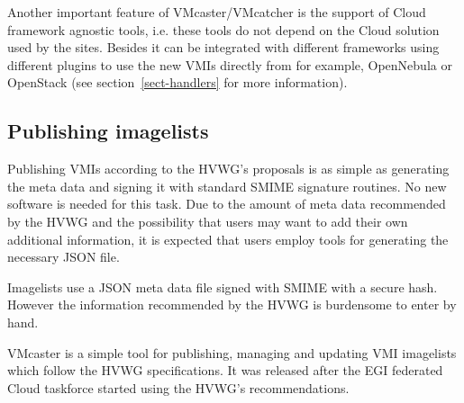 \documentclass{cai}
\begin{document}
Another important feature of VMcaster/VMcatcher is the support of Cloud framework agnostic tools, i.e. these tools do not depend on the Cloud solution used by the sites. Besides it can be integrated with different frameworks using different plugins to use the new VMIs directly from for example, OpenNebula or OpenStack (see section~\ref{sect-handlers} for more information).



\subsection{Publishing imagelists}
Publishing VMIs according to the HVWG's proposals is as simple as generating the meta data and signing it with standard SMIME signature routines. No new software is needed for this task. 
Due to the amount of meta data recommended by the HVWG and the possibility that users may want to add their own additional information, it is expected that users employ tools for generating the necessary JSON file.

Imagelists use a JSON meta data file signed with SMIME  with a secure hash. However the information recommended by the HVWG is burdensome to enter by hand.
 
VMcaster is a simple tool for publishing, managing and updating VMI imagelists which follow the HVWG specifications. It was released after the EGI federated Cloud taskforce started using the HVWG's recommendations. 
\end{document}
